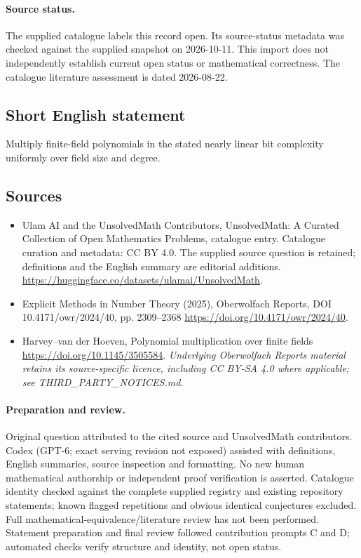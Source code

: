 \documentclass[11pt]{article}
\begin{document}
\paragraph{Source status.}
The supplied catalogue labels this record open. Its source-status metadata was checked against the supplied snapshot on 2026-10-11. This import does not independently establish current open status or mathematical correctness. The catalogue literature assessment is dated 2026-08-22.
\subsection{Short English statement}
Multiply finite-field polynomials in the stated nearly linear bit complexity uniformly over field size and degree.
\subsection{Sources}
\begin{itemize}
\item[S1] Ulam AI and the UnsolvedMath Contributors, UnsolvedMath: A Curated Collection of Open Mathematics Problems, catalogue entry. Catalogue curation and metadata: CC BY 4.0. The supplied source question is retained; definitions and the English summary are editorial additions.
\url{https://huggingface.co/datasets/ulamai/UnsolvedMath}.
\item[S2] Explicit Methods in Number Theory (2025), Oberwolfach Reports, DOI 10.4171/owr/2024/40, pp. 2309--2368
\url{https://doi.org/10.4171/owr/2024/40}.
\item[S3] Harvey--van der Hoeven, Polynomial multiplication over finite fields
\url{https://doi.org/10.1145/3505584}.
\textit{Underlying Oberwolfach Reports material retains its source-specific licence, including CC BY-SA 4.0 where applicable; see THIRD\_PARTY\_NOTICES.md.}
\end{itemize}
\paragraph{Preparation and review.}
Original question attributed to the cited source and UnsolvedMath contributors. Codex (GPT-6; exact serving revision not exposed) assisted with definitions, English summaries, source inspection and formatting. No new human mathematical authorship or independent proof verification is asserted. Catalogue identity checked against the complete supplied registry and existing repository statements; known flagged repetitions and obvious identical conjectures excluded. Full mathematical-equivalence/literature review has not been performed. Statement preparation and final review followed contribution prompts C and D; automated checks verify structure and identity, not open status.
\label{end:statement}
\end{document}
